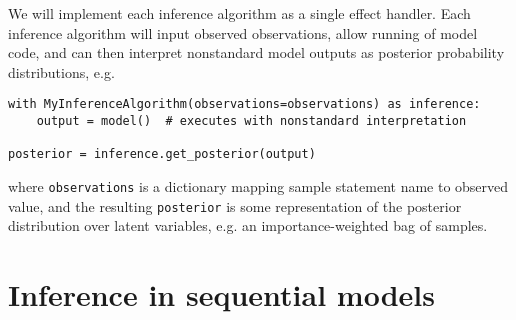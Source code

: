 \documentclass[anonymous=false, %
               format=acmsmall, %
               review=true, %
               screen=true, %
               nonacm=true]{acmart}
\begin{document}
We will implement each inference algorithm as a single effect handler.
Each inference algorithm will input observed observations, allow running of model code, and can then interpret nonstandard model outputs as posterior probability distributions, e.g.
\begin{Verbatim}[samepage=true]
with MyInferenceAlgorithm(observations=observations) as inference:
    output = model()  # executes with nonstandard interpretation

posterior = inference.get_posterior(output)
\end{Verbatim}
where \verb$observations$ is a dictionary mapping sample statement name to observed value, and the resulting \verb$posterior$ is some representation of the posterior distribution over latent variables, e.g. an importance-weighted bag of samples.

\section{Inference in sequential models}
\end{document}
